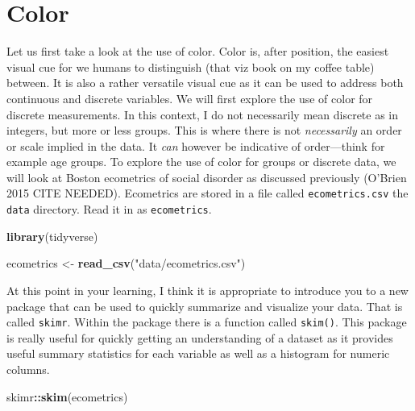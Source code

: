 \documentclass[
]{book}
\newenvironment{Shaded}{\begin{snugshade}}{\end{snugshade}}
\newcommand{\KeywordTok}[1]{\textcolor[rgb]{0.13,0.29,0.53}{\textbf{#1}}}
\newcommand{\NormalTok}[1]{#1}
\newcommand{\OperatorTok}[1]{\textcolor[rgb]{0.81,0.36,0.00}{\textbf{#1}}}
\newcommand{\StringTok}[1]{\textcolor[rgb]{0.31,0.60,0.02}{#1}}
\begin{document}
\hypertarget{color}{%
\section{Color}\label{color}}

Let us first take a look at the use of color. Color is, after position, the easiest visual cue for we humans to distinguish (that viz book on my coffee table) between. It is also a rather versatile visual cue as it can be used to address both continuous and discrete variables. We will first explore the use of color for discrete measurements. In this context, I do not necessarily mean discrete as in integers, but more or less groups. This is where there is not \emph{necessarily} an order or scale implied in the data. It \emph{can} however be indicative of order---think for example age groups. To explore the use of color for groups or discrete data, we will look at Boston ecometrics of social disorder as discussed previously (O'Brien 2015 CITE NEEDED). Ecometrics are stored in a file called \texttt{ecometrics.csv} the \texttt{data} directory. Read it in as \texttt{ecometrics}.

\begin{Shaded}
\begin{Highlighting}[]
\KeywordTok{library}\NormalTok{(tidyverse)}

\NormalTok{ecometrics \textless{}{-}}\StringTok{ }\KeywordTok{read\_csv}\NormalTok{(}\StringTok{"data/ecometrics.csv"}\NormalTok{)}
\end{Highlighting}
\end{Shaded}

At this point in your learning, I think it is appropriate to introduce you to a new package that can be used to quickly summarize and visualize your data. That is called \texttt{skimr}. Within the package there is a function called \texttt{skim()}. This package is really useful for quickly getting an understanding of a dataset as it provides useful summary statistics for each variable as well as a histogram for numeric columns.

\begin{Shaded}
\begin{Highlighting}[]
\NormalTok{skimr}\OperatorTok{::}\KeywordTok{skim}\NormalTok{(ecometrics)}
\end{Highlighting}
\end{Shaded}
\end{document}
